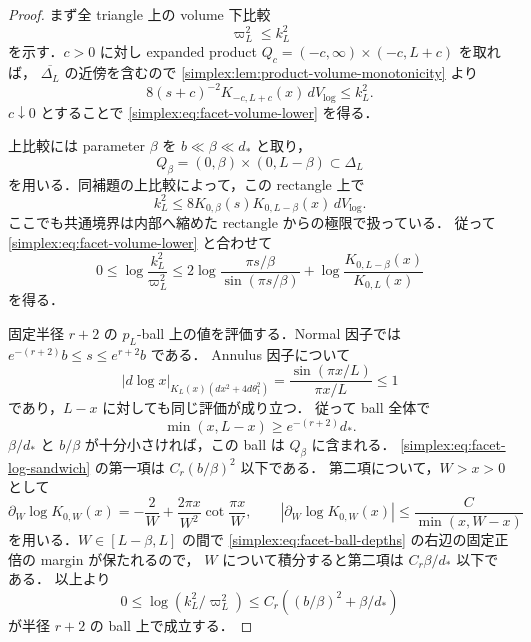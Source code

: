 \begin{proof}
まず全 triangle 上の volume 下比較
\begin{equation}\label{simplex:eq:facet-volume-lower}
 \varpi_L^2\le k_L^2
\end{equation}
を示す．$c>0$ に対し expanded product
$Q_c=(-c,\infty)\times(-c,L+c)$ を取れば，
$\overline{\Delta_L}$ の近傍を含むので
\cref{simplex:lem:product-volume-monotonicity} より
\[
 8(s+c)^{-2}K_{-c,L+c}(x)\,dV_{\log}\le k_L^2.
\]
$c\downarrow0$ とすることで \eqref{simplex:eq:facet-volume-lower} を得る．

上比較には parameter $\beta$ を $b\ll\beta\ll d_*$ と取り，
\[
 Q_\beta=(0,\beta)\times(0,L-\beta)\subset\Delta_L
\]
を用いる．同補題の上比較によって，この rectangle 上で
\begin{equation}\label{simplex:eq:facet-volume-upper}
 k_L^2
 \le8K_{0,\beta}(s)K_{0,L-\beta}(x)\,dV_{\log}.
\end{equation}
ここでも共通境界は内部へ縮めた rectangle からの極限で扱っている．
従って \eqref{simplex:eq:facet-volume-lower} と合わせて
\begin{equation}\label{simplex:eq:facet-log-sandwich}
 0\le\log\frac{k_L^2}{\varpi_L^2}
 \le 2\log\frac{\pi s/\beta}{\sin(\pi s/\beta)}
       +\log\frac{K_{0,L-\beta}(x)}{K_{0,L}(x)}
\end{equation}
を得る．

固定半径 $r+2$ の $p_L$-ball 上の値を評価する．Normal 因子では
$e^{-(r+2)}b\le s\le e^{r+2}b$ である．
Annulus 因子について
\[
 |d\log x|_{K_L(x)(dx^2+4d\theta_1^2)}
  =\frac{\sin(\pi x/L)}{\pi x/L}\le1
\]
であり，$L-x$ に対しても同じ評価が成り立つ．
従って ball 全体で
\begin{equation}\label{simplex:eq:facet-ball-depths}
 \min(x,L-x)\ge e^{-(r+2)}d_*.
\end{equation}
$\beta/d_*$ と $b/\beta$ が十分小さければ，この ball は $Q_\beta$ に含まれる．
\eqref{simplex:eq:facet-log-sandwich} の第一項は $C_r(b/\beta)^2$ 以下である．
第二項について，$W>x>0$ として
\[
 \partial_W\log K_{0,W}(x)
  =-\frac2W+\frac{2\pi x}{W^2}\cot\frac{\pi x}{W},
 \qquad
 |\partial_W\log K_{0,W}(x)|
  \le\frac{C}{\min(x,W-x)}
\]
を用いる．$W\in[L-\beta,L]$ の間で
\eqref{simplex:eq:facet-ball-depths} の右辺の固定正倍の margin が保たれるので，
$W$ について積分すると第二項は $C_r\beta/d_*$ 以下である．
以上より
\begin{equation}\label{simplex:eq:facet-small-potential}
 0\le\log(k_L^2/\varpi_L^2)
 \le C_r\left((b/\beta)^2+\beta/d_*\right)
\end{equation}
が半径 $r+2$ の ball 上で成立する．


\end{proof}
